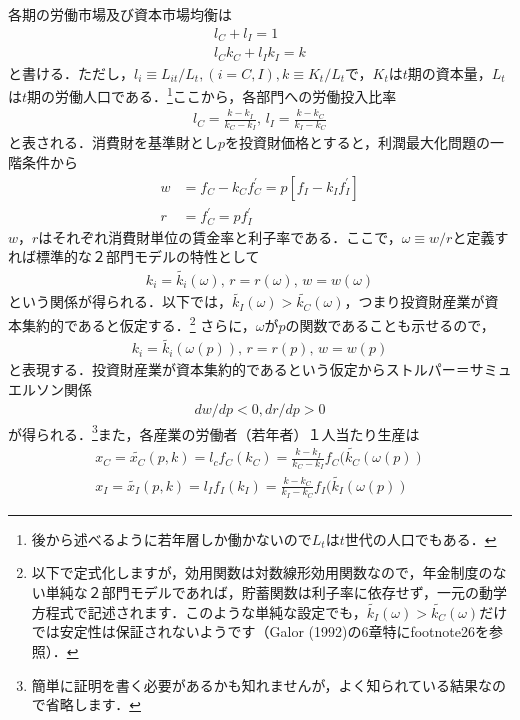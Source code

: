\documentclass[12pt,a4paper]{jsarticle}
\begin{document}
各期の労働市場及び資本市場均衡は
\begin{align}
 l_{C} +  l_{I} =1 \\
 l_{C} k_{C}+  l_{I} k_{I}= k
\end{align}
と書ける．ただし，$l_{i} \equiv L_{it}/L_{t},  (i = C,I), k \equiv K_{t}/L_{t}$で，$K_{t}$は$t$期の資本量，$L_{t}$は$t$期の労働人口である．\footnote{
後から述べるように若年層しか働かないので$L_{t}$は$t$世代の人口でもある．
}ここから，各部門への労働投入比率
\begin{align}
 l_{C} = \frac{k-k_{I}}{k_{C}-k_{I}}, \,  l_{I} = \frac{k-k_{C}}{k_{I}-k_{C}}
\end{align}
と表される．消費財を基準財とし$p$を投資財価格とすると，利潤最大化問題の一階条件から
\begin{align}
 w &= f_{C} - k_{C} f_{C}^{\prime} = p \left[f_{I} - k_{I} f_{I}^{\prime} \right] \\
r &= f_{C}^{\prime} =  p f_{I}^{\prime}
\end{align}
$w$，$r$はそれぞれ消費財単位の賃金率と利子率である．ここで，$\omega \equiv w/r$と定義すれば標準的な２部門モデルの特性として
\begin{align}
 k_{i} =\tilde{k_{i}}(\omega), \, r =r(\omega), \, w = w(\omega) \label{eq:17}
\end{align}
という関係が得られる．以下では，$\tilde{k_{I}}(\omega) > \tilde{k_{C}}(\omega)$，つまり投資財産業が資本集約的であると仮定する．\footnote{以下で定式化しますが，効用関数は対数線形効用関数なので，年金制度のない単純な２部門モデルであれば，貯蓄関数は利子率に依存せず，一元の動学方程式で記述されます．このような単純な設定でも，$\tilde{k_{I}}(\omega) > \tilde{k_{C}}(\omega)$だけでは安定性は保証されないようです（Galor (1992)の6章特にfootnote26を参照）．}
さらに，$\omega$が$p$の関数であることも示せるので，
\begin{align}
  k_{i} =\tilde{k_{i}}(\omega(p)), \, r =r(p), \, w = w(p)
\end{align}
と表現する．投資財産業が資本集約的であるという仮定からストルパー＝サミュエルソン関係
\begin{align}
 dw/dp <0, dr/dp>0 \label{eq:7}
\end{align}
が得られる．\footnote{簡単に証明を書く必要があるかも知れませんが，よく知られている結果なので省略します．}また，各産業の労働者（若年者）１人当たり生産は
\begin{align}
 x_{C} = \tilde{ x_{C}}(p, k) = l_{c}f_{C}(k_{C}) = \frac{k-k_{I}}{k_{C}-k_{I}} f_{C}(\tilde{k_{C}}(\omega(p))  \label{eq:11}\\
x_{I} = \tilde{ x_{I}}(p, k) = l_{I}f_{I}(k_{I}) = \frac{k -k_{C}}{k_{I}-k_{C}} f_{I}(\tilde{k_{I}}(\omega(p)) \label{eq:12}
\end{align}
\end{document}
